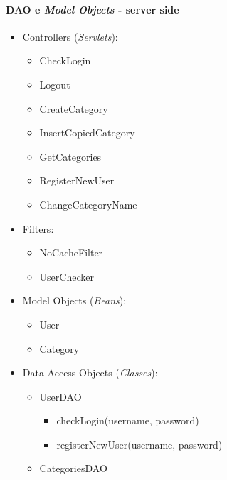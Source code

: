 \pagebreak

\hypertarget{dao-e-model-objects---server-side}{%
\paragraph{\texorpdfstring{DAO e \emph{Model Objects} - server
side}{DAO e Model Objects - server side}}\label{dao-e-model-objects---server-side}}

\begin{itemize}
\tightlist
\item
  Controllers (\emph{Servlets}):

  \begin{itemize}
  \tightlist
  \item
    CheckLogin
  \item
    Logout
  \item
    CreateCategory
  \item
    InsertCopiedCategory
  \item
    GetCategories
  \item
    RegisterNewUser
  \item
    ChangeCategoryName
  \end{itemize}
\item
  Filters:

  \begin{itemize}
  \tightlist
  \item
    NoCacheFilter
  \item
    UserChecker
  \end{itemize}
\item
  Model Objects (\emph{Beans}):

  \begin{itemize}
  \tightlist
  \item
    User
  \item
    Category
  \end{itemize}
\item
  Data Access Objects (\emph{Classes}):

  \begin{itemize}
  \tightlist
  \item
    UserDAO

    \begin{itemize}
    \tightlist
    \item
      checkLogin(username, password)
    \item
      registerNewUser(username, password)
    \end{itemize}
  \item
    CategoriesDAO


\end{itemize}
\end{itemize}
